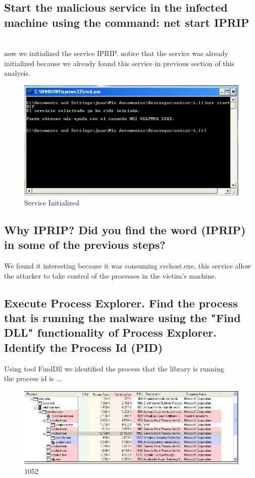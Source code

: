 \documentclass[12pt,letter]{article} %
\begin{document}
        \subsection{Start the malicious service in the infected machine using
        the command: net start IPRIP}
		$ $
        \\ now we initialized the service IPRIP. notice that the service was
        already initialized because we already found this service in previous
        section of this analysis.
        \pagebreak

        \begin{figure}[h!]
            \centering
            \includegraphics[width=0.5\linewidth]{iprip.jpeg}
            \caption{Service Initialized}
            \label{IPRIP}
        \end{figure}


        \subsection{Why IPRIP? Did you find the word (IPRIP) in some of the
        previous steps?}

            We found it interesting because it was
            consuming svchost.exe, this service allow the attacker to take control
            of the processes in the  victim's machine.


        \subsection{Execute Process Explorer. Find the process that is running
        the malware using the "Find DLL" functionality of Process Explorer.
        Identify the Process Id (PID)}
            Using tool FindDll we identified the process that the library is running
            \\
            the process id is ...
            \begin{figure}[h!]
                \centering
                \includegraphics[width=0.4\linewidth]{processid.jpeg}
                \caption{1052}
                \label{1052}
            \end{figure}
\end{document}
